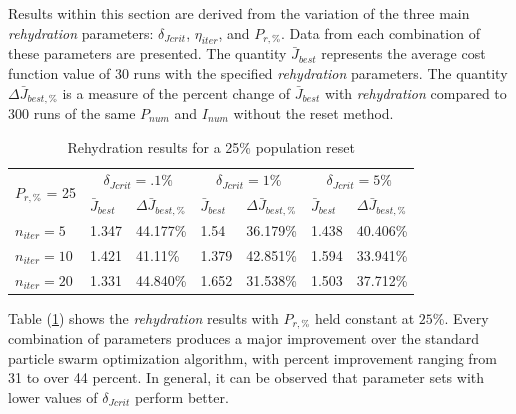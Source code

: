 \noindent Results within this section are derived from the variation of the three main \textit{rehydration} parameters: $\delta_{Jcrit}$, $\eta_{iter}$,
and $P_{r,\text{\%}}$. Data from each combination of these parameters are presented.
The quantity $\bar{J}_{best}$ represents the average cost function value of 30 runs with the specified \textit{rehydration} 
parameters. The quantity $\Delta \bar{J}_{best,\text{\%}}$ is a measure of the percent change of $\bar{J}_{best}$ with \textit{rehydration} compared to 300 
runs of the same $P_{num}$ and $I_{num}$ without the reset method.



\begin{table}[H]
  \centering
  \begin{tabular}{lll|ll|ll}
    \toprule
    \multirow{2}{*}{$P_{r,\text{\%}}$ = 25} &
      \multicolumn{2}{c}{$\delta_{Jcrit} = .1\%$  } &
      \multicolumn{2}{c}{$\delta_{Jcrit} =  1\%$} &
      \multicolumn{2}{c}{$\delta_{Jcrit} = 5\%$} \\
      \cmidrule{2-7}
    & $\bar{J}_{best}$ & $\Delta \bar{J}_{best,\text{\%}}$ & $\bar{J}_{best}$ & $\Delta \bar{J}_{best,\text{\%}}$ & $\bar{J}_{best}$ & $\Delta \bar{J}_{best,\text{\%}}$ \\
    \midrule

    $n_{iter}=5$ & 1.347 & 44.177\% & 1.54 & 36.179\% & 1.438 & 40.406\% \\
    $n_{iter}=10$ & 1.421 & 41.11\% & 1.379 & 42.851\% & 1.594 & 33.941\% \\
    $n_{iter}=20$ & 1.331 & 44.840\% & 1.652 & 31.538\% & 1.503 & 37.712\% \\
    \bottomrule
  \end{tabular}
  \caption{Rehydration results for a 25\% population reset}
  \label{tab:rehydation-p25}
\end{table}

\noindent Table (\ref{tab:rehydation-p25}) shows the \textit{rehydration} results with $P_{r,\text{\%}}$ held constant
at $25\%$. Every combination of parameters produces a major improvement over the standard particle swarm optimization algorithm,
with percent improvement ranging from 31 to over 44 percent. In general, it can be observed that parameter sets 
with lower values of $\delta_{Jcrit}$ perform better. 

